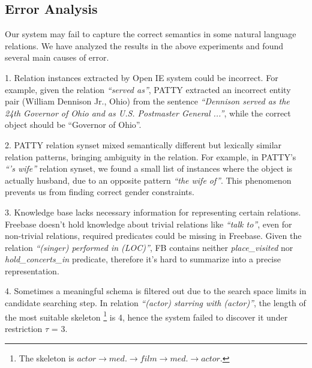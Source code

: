 \subsection{Error Analysis}

Our system may fail to capture the correct semantics in some natural language relations.
We have analyzed the results in the above experiments and
found several main causes of error.

1. Relation instances extracted by Open IE system could be incorrect.
For example, given the relation \textit{``served as''}, PATTY extracted
an incorrect entity pair (William Dennison Jr., Ohio) from the sentence
\textit{``Dennison served as the 24th Governor of Ohio and as U.S. Postmaster General ...''},
while the correct object should be ``Governor of Ohio''.

2. PATTY relation synset mixed semantically different but lexically similar
relation patterns, bringing ambiguity in the relation.
For example, in PATTY's \textit{``'s wife''} relation synset, we found a small list of instances
where the object is actually husband, due to an opposite pattern \textit{``the wife of''}.
This phenomenon prevents us from finding correct gender constraints.

3. Knowledge base lacks necessary information for representing certain relations.
Freebase doesn't hold knowledge about trivial relations like \textit{``talk to''},
even for non-trivial relations, required predicates could be missing in Freebase.
Given the relation \textit{``(singer) performed in (LOC)''}, FB contains			%
neither \textit{place\_visited} nor \textit{hold\_concerts\_in} predicate, therefore
it's hard to summarize into a precise representation.

4. Sometimes a meaningful schema is filtered out due to
the search space limits in candidate searching step.
In relation \textit{``(actor) starring with (actor)''},
the length of the most suitable skeleton
\footnote{The skeleton is $actor \rightarrow med. \rightarrow film \rightarrow med. \rightarrow actor$.}
is 4, hence the system failed to discover it under restriction $\tau$ = 3.

